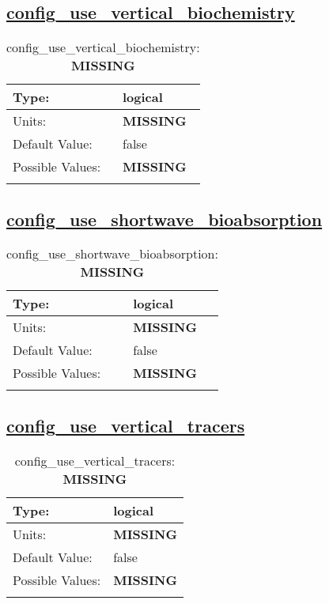 \subsection[config\_use\_vertical\_biochemistry]{\hyperref[sec:nm_tab_biogeochemistry]{config\_use\_vertical\_biochemistry}}
\label{subsec:nm_sec_config_use_vertical_biochemistry}
\begin{center}
\begin{longtable}{| p{2.0in} || p{4.0in} |}
    \hline
    Type: & logical \\
    \hline
    Units: & {\bf \color{red} MISSING} \\
    \hline
    Default Value: & false \\
    \hline
    Possible Values: & {\bf \color{red} MISSING} \\
    \hline
    \caption{config\_use\_vertical\_biochemistry: {\bf \color{red} MISSING}}
\end{longtable}
\end{center}
\subsection[config\_use\_shortwave\_bioabsorption]{\hyperref[sec:nm_tab_biogeochemistry]{config\_use\_shortwave\_bioabsorption}}
\label{subsec:nm_sec_config_use_shortwave_bioabsorption}
\begin{center}
\begin{longtable}{| p{2.0in} || p{4.0in} |}
    \hline
    Type: & logical \\
    \hline
    Units: & {\bf \color{red} MISSING} \\
    \hline
    Default Value: & false \\
    \hline
    Possible Values: & {\bf \color{red} MISSING} \\
    \hline
    \caption{config\_use\_shortwave\_bioabsorption: {\bf \color{red} MISSING}}
\end{longtable}
\end{center}
\subsection[config\_use\_vertical\_tracers]{\hyperref[sec:nm_tab_biogeochemistry]{config\_use\_vertical\_tracers}}
\label{subsec:nm_sec_config_use_vertical_tracers}
\begin{center}
\begin{longtable}{| p{2.0in} || p{4.0in} |}
    \hline
    Type: & logical \\
    \hline
    Units: & {\bf \color{red} MISSING} \\
    \hline
    Default Value: & false \\
    \hline
    Possible Values: & {\bf \color{red} MISSING} \\
    \hline
    \caption{config\_use\_vertical\_tracers: {\bf \color{red} MISSING}}
\end{longtable}
\end{center}

